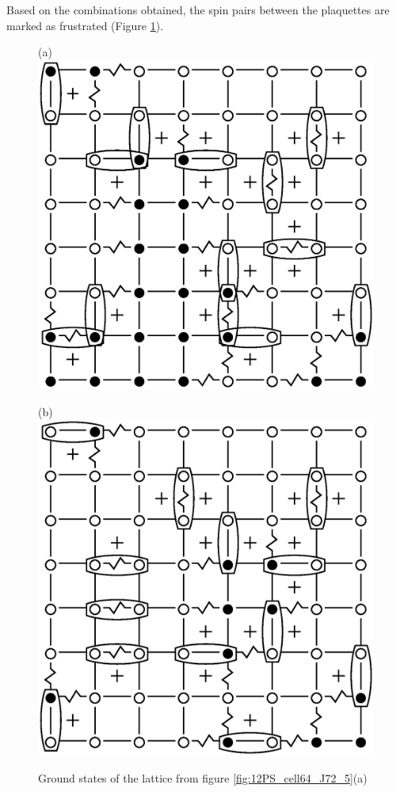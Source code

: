 \documentclass[preprint,12pt]{elsarticle}
\begin{document}
Based on the combinations obtained, the spin pairs between the plaquettes are marked as frustrated (Figure \ref{fig:12F_cell64_J72_5}).

\begin{figure}[H]
	\centering
	\begin{minipage}[h]{0.3\linewidth}
		\centering(a)
		\includegraphics[width=1\linewidth]{pictures/1Conf_cell64_J72_5.eps}
	\end{minipage}
	\hspace{15pt}
	\begin{minipage}[h]{0.3\linewidth}
		\centering(b)
		\includegraphics[width=1\linewidth]{pictures/2Conf_cell64_J72_5.eps}
	\end{minipage}
	\caption{Ground states of the lattice from figure \ref{fig:12PS_cell64_J72_5}(a)}
	\label{fig:12F_cell64_J72_5}
\end{figure}
\end{document}
